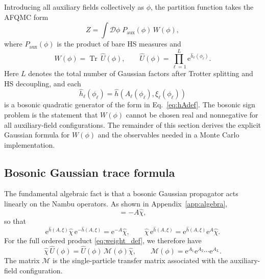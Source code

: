 \documentclass[twocolumn,aps,prb,10pt,amsmath,amssymb,amsthm,superscriptaddress]{revtex4-2}
\newcommand{\Tr}{\operatorname{Tr}}
\newcommand{\ee}{\mathrm{e}}
\newcommand{\mc}[1]{\mathcal{#1}}
\theoremstyle{remark}
\begin{document}
Introducing all auxiliary fields collectively as $\phi$, the partition function takes the AFQMC form
\begin{equation}
    Z = \int \mc D\phi\; P_{\mathrm{aux}}(\phi)\, W(\phi),
    \label{eq:Z_afqmc}
\end{equation}
where $P_{\mathrm{aux}}(\phi)$ is the product of bare HS measures and
\begin{equation}
    W(\phi) = \Tr\, \hat U(\phi),
    \qquad
    \hat U(\phi) = \prod_{\ell=1}^{L} \ee^{\hat h_\ell(\phi_\ell)}.
    \label{eq:weight_def}
\end{equation}
Here $L$ denotes the total number of Gaussian factors after Trotter splitting and HS decoupling, and each
\begin{equation}
    \hat h_\ell(\phi_\ell) = \hat h\left(A_\ell(\phi_\ell),\xi_\ell(\phi_\ell)\right)
\end{equation}
is a bosonic quadratic generator of the form in Eq.~\eqref{eq:hAdef}. The bosonic sign problem is the statement that $W(\phi)$ cannot be chosen real and nonnegative for all auxiliary-field configurations. The remainder of this section derives the explicit Gaussian formula for $W(\phi)$ and the observables needed in a Monte Carlo implementation.

\subsection{Bosonic Gaussian trace formula}

The fundamental algebraic fact is that a bosonic Gaussian propagator acts linearly on the Nambu operators. As shown in Appendix~\ref{app:algebra},
\begin{equation}
    [\hat h(A,\xi),\hat\chi] = -A\hat\chi,
    \label{eq:commutator_key}
\end{equation}
so that
\begin{equation}
    \ee^{\hat h(A,\xi)}\hat\chi\,\ee^{-\hat h(A,\xi)} = \ee^{-A}\hat\chi,
    \qquad
    \hat\chi\,\ee^{\hat h(A,\xi)} = \ee^{\hat h(A,\xi)}\ee^{A}\hat\chi.
    \label{eq:linear_action}
\end{equation}
For the full ordered product \eqref{eq:weight_def}, we therefore have
\begin{equation}
    \hat\chi\,\hat U(\phi) = \hat U(\phi)\,\mc M(\phi)\hat\chi,
    \qquad
    \mc M(\phi) = \ee^{A_1}\ee^{A_2}\cdots \ee^{A_L}.
    \label{eq:Mdef}
\end{equation}
The matrix $\mc M$ is the single-particle transfer matrix associated with the auxiliary-field configuration.
\end{document}
